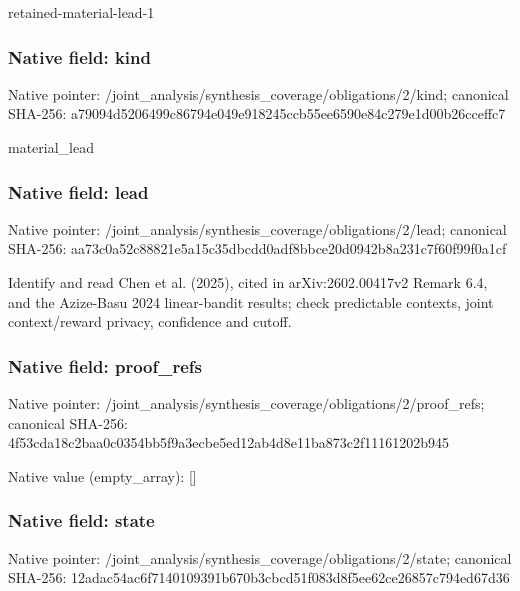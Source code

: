 \documentclass[10pt,a4paper]{article}
\begin{document}
\begingroup\raggedright\sloppy retained-material-lead-1\par\endgroup

\subsubsection{Native field: kind}
Native pointer: /joint\_\allowbreak{}analysis/synthesis\_\allowbreak{}coverage/obligations/2/kind; canonical SHA-256: a79094d5206499c86794e049e918245ccb55ee6590e84c279e1d00b26cceffc7

\begingroup\raggedright\sloppy material\_\allowbreak{}lead\par\endgroup

\subsubsection{Native field: lead}
Native pointer: /joint\_\allowbreak{}analysis/synthesis\_\allowbreak{}coverage/obligations/2/lead; canonical SHA-256: aa73c0a52c88821e5a15c35dbcdd0adf8bbce20d0942b8a231c7f60f99f0a1cf

\begingroup\raggedright\sloppy Identify and read Chen et al. (2025),\allowbreak{} cited in arXiv:\allowbreak{}2602.00417v2 Remark 6.4,\allowbreak{} and the Azize-Basu 2024 linear-bandit results;\allowbreak{} check predictable contexts,\allowbreak{} joint context/\allowbreak{}reward privacy,\allowbreak{} confidence and cutoff.\par\endgroup

\subsubsection{Native field: proof\_\allowbreak{}refs}
Native pointer: /joint\_\allowbreak{}analysis/synthesis\_\allowbreak{}coverage/obligations/2/proof\_\allowbreak{}refs; canonical SHA-256: 4f53cda18c2baa0c0354bb5f9a3ecbe5ed12ab4d8e11ba873c2f11161202b945

Native value (empty\_\allowbreak{}array): []

\subsubsection{Native field: state}
Native pointer: /joint\_\allowbreak{}analysis/synthesis\_\allowbreak{}coverage/obligations/2/state; canonical SHA-256: 12adac54ac6f7140109391b670b3cbcd51f083d8f5ee62ce26857c794ed67d36
\end{document}
